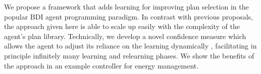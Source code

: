 

We propose a framework that adds learning for improving plan selection in the popular BDI agent programming paradigm.
%
In contrast with previous proposals, the approach given here is able to scale up easily with the complexity of the agent's plan library.
%
Technically, we develop a novel confidence measure which allows the agent to adjust its reliance on the learning dynamically
, facilitating in principle infinitely many learning and relearning phases.
%
We show the benefits of the approach in an example controller for energy management.


%
%
%
%

